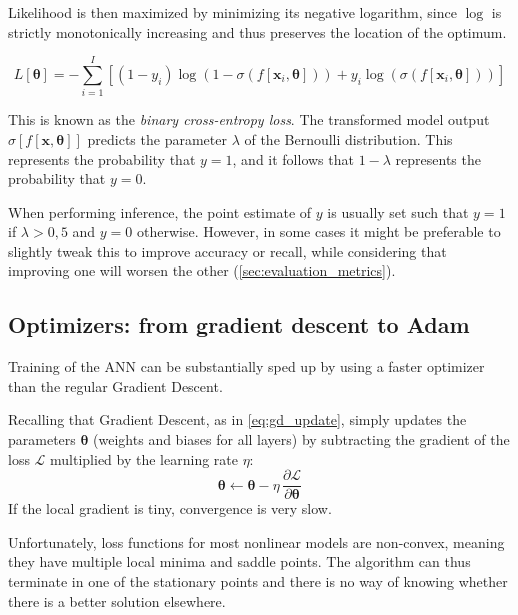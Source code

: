 Likelihood is then maximized by minimizing its negative logarithm, since $\log$ is strictly monotonically increasing and thus preserves the location of the optimum.

\begin{equation}
    L[\boldsymbol{\theta}] =
    -\sum_{i=1}^{I} \left[(1-y_i)\log\left(1 - \sigma(f[\mathbf{x}_i,
    \boldsymbol{\theta}])\right) + y_i \log\left(\sigma(f[\mathbf{x}_i,
    \boldsymbol{\theta}])\right)\right]
\end{equation}

This is known as the \textit{binary cross-entropy loss}. The transformed model output $\sigma[f[\mathbf{x}, \boldsymbol{\theta}]]$ predicts the parameter $\lambda$ of the Bernoulli distribution. This represents the probability that $y = 1$, and it follows that $1 - \lambda$ represents the probability that $y = 0$.

When performing inference, the point estimate of $y$ is usually set such that $y = 1$ if $\lambda > 0{,}5$ and $y = 0$ otherwise.
However, in some cases it might be preferable to slightly tweak this to improve accuracy or recall, while considering that improving one will worsen the other (\cref{sec:evaluation_metrics}).


\subsection{Optimizers: from gradient descent to Adam}
\label{subsec:adam}

Training of the ANN can be substantially sped up by using a faster optimizer than the regular Gradient Descent.

Recalling that Gradient Descent, as in \cref{eq:gd_update}, simply updates the parameters $\boldsymbol{\theta}$ (weights and biases for all layers) by subtracting the gradient of the loss $\mathcal{L}$ multiplied by the learning rate $\eta$:
\begin{equation*}
    \boldsymbol{\theta} \leftarrow \boldsymbol{\theta} - \eta \, \frac{\partial \mathcal{L}}{\partial \boldsymbol{\theta}}
\end{equation*}
If the local gradient is tiny, convergence is very slow.

Unfortunately, loss functions for most nonlinear models are non-convex, meaning they have multiple local minima and saddle points. The algorithm can thus terminate in one
of the stationary points and there is no way of knowing whether there is a better solution elsewhere.

